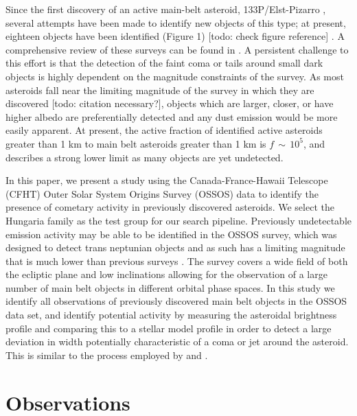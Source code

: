 \documentclass[iop,apj]{emulateapj}
\begin{document}
Since the first discovery of an active main-belt asteroid, 133P/Elst-Pizarro \citep{elst96}, several attempts have been made to identify new objects of this type; at present, eighteen objects have been identified (Figure 1) [todo: check figure reference] \citep{jewitt15}. A comprehensive review of these surveys can be found in \citet{hsieh15}.  A persistent challenge to this effort is that the detection of the faint coma or tails around small dark objects is highly dependent on the magnitude constraints of the survey. As most asteroids fall near the limiting magnitude of the survey in which they are discovered [todo: citation necessary?], objects which are larger, closer, or have higher albedo are preferentially detected and any dust emission would be more easily apparent. At present, the active fraction of identified active asteroids greater than 1 km to main belt asteroids greater than 1 km is $f \, \sim \, 10^5$, and describes a strong lower limit as many objects are yet undetected. \citep{jewitt15} %

In this paper, we present a study using the Canada-France-Hawaii Telescope (CFHT) Outer Solar System Origins Survey (OSSOS) data to identify the presence of cometary activity in previously discovered asteroids. We select the Hungaria family as the test group for our search pipeline. Previously undetectable emission activity may be able to be identified in the OSSOS survey, which was designed to detect trans neptunian objects and as such has a limiting magnitude that is much lower than previous surveys \citep{hsieh15}. The survey covers a wide field of both the ecliptic plane and low inclinations allowing for the observation of a large number of main belt objects in different orbital phase spaces. In this study we
identify all observations of previously discovered main belt objects in the OSSOS data set, and identify potential activity by measuring the asteroidal brightness profile and comparing this to a stellar model profile in order to detect a large deviation in width potentially characteristic of a coma or jet around the asteroid. This is similar to the process employed by \citet*{luu92} and \citet*{sonnett11}.



\section{Observations}
\end{document}
